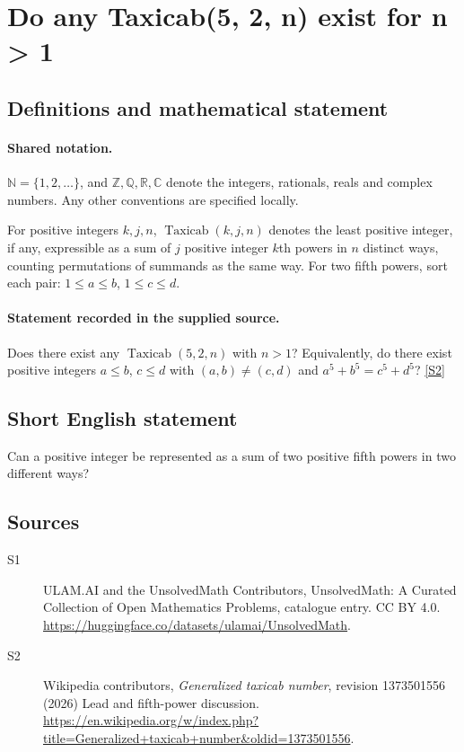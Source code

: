 \documentclass[11pt]{article}
\newcommand{\sref}[2]{\hyperlink{source:#1:#2}{[S#2]}}
\begin{document}
\section{Do any Taxicab(5, 2, n) exist for n > 1}\label{statement}

\subsection{Definitions and mathematical statement}

\paragraph{Shared notation.}$\mathbb N=\{1,2,\ldots\}$, and $\mathbb Z,\mathbb Q,\mathbb R,\mathbb C$ denote the integers, rationals, reals and complex numbers. Any other conventions are specified locally.


For positive integers $k,j,n$, $\operatorname{Taxicab}(k,j,n)$ denotes the least positive integer, if any, expressible as a sum of $j$ positive integer $k$th powers in $n$ distinct ways, counting permutations of summands as the same way. For two fifth powers, sort each pair: $1\le a\le b$, $1\le c\le d$.
\paragraph{Statement recorded in the supplied source.}
Does there exist any $\operatorname{Taxicab}(5,2,n)$ with $n>1$? Equivalently, do there exist positive integers $a\le b$, $c\le d$ with $(a,b)\ne(c,d)$ and $a^5+b^5=c^5+d^5$? \sref{statement}{2}
\subsection{Short English statement}
Can a positive integer be represented as a sum of two positive fifth powers in two different ways?
\subsection{Sources}
\begin{description}
\item[\hypertarget{source:statement:1}{S1}] ULAM.AI and the UnsolvedMath Contributors, UnsolvedMath: A Curated Collection of Open Mathematics Problems, catalogue entry. CC BY 4.0. \url{https://huggingface.co/datasets/ulamai/UnsolvedMath}.
\item[\hypertarget{source:statement:2}{S2}] Wikipedia contributors, \emph{Generalized taxicab number}, revision 1373501556 (2026) Lead and fifth-power discussion. \url{https://en.wikipedia.org/w/index.php?title=Generalized+taxicab+number&oldid=1373501556}.
\end{description}
\label{end:statement}
\end{document}
